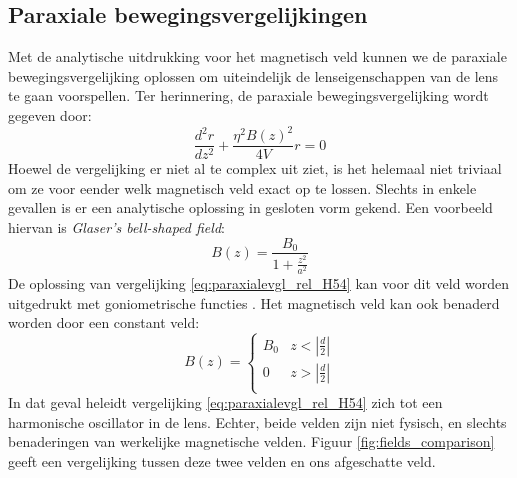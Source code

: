 \documentclass[we,twoside,openright,a4paper,11pt]{uantwerpenbamathesis}
\begin{document}
\subsection{Paraxiale bewegingsvergelijkingen}
Met de analytische uitdrukking voor het magnetisch veld kunnen we de paraxiale bewegingsvergelijking oplossen om uiteindelijk de lenseigenschappen van de lens te gaan voorspellen. Ter herinnering, de paraxiale bewegingsvergelijking wordt gegeven door:
\begin{equation}\label{eq:paraxialevgl_rel_H54}
    \frac{d^2r}{dz^2}+\frac{\eta^2B(z)^2}{4V}r=0
\end{equation}
Hoewel de vergelijking er niet al te complex uit ziet, is het helemaal niet triviaal om ze voor eender welk magnetisch veld exact op te lossen. Slechts in enkele gevallen is er een analytische oplossing in gesloten vorm gekend. Een voorbeeld hiervan is \textit{Glaser's bell-shaped field}:
\begin{equation}\label{eq:Glasers_field}
    B(z) = \frac{B_0}{1+\frac{z^2}{a^2}}
\end{equation}
De oplossing van vergelijking \ref{eq:paraxialevgl_rel_H54} kan voor dit veld worden uitgedrukt met goniometrische functies \cite{PWHawkes}. Het magnetisch veld kan ook benaderd worden door een constant veld:
\begin{equation}\label{eq:constant_field}
    B(z) = 
    \begin{cases}
        B_0 & z<\left|\frac{d}{2}\right|\\
        0 & z>\left|\frac{d}{2}\right|\\
    \end{cases}
\end{equation}
In dat geval heleidt vergelijking \ref{eq:paraxialevgl_rel_H54} zich tot een harmonische oscillator in de lens. Echter, beide velden zijn niet fysisch, en slechts benaderingen van werkelijke magnetische velden. Figuur \ref{fig:fields_comparison} geeft een vergelijking tussen deze twee velden en ons afgeschatte veld.
\end{document}
